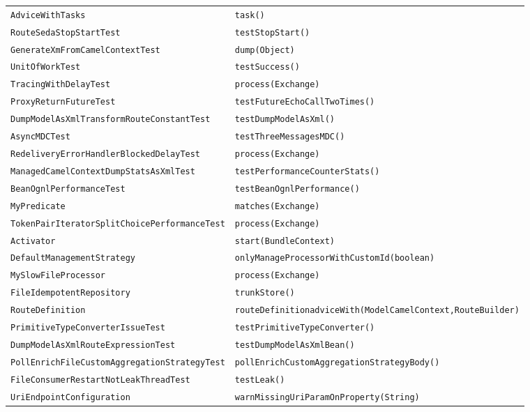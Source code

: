 \begin{center}
\begin{longtable}{ll}
\lstinline/AdviceWithTasks/&{\lstinline/task()/}\\
\lstinline/RouteSedaStopStartTest/&{\lstinline/testStopStart()/}\\
\lstinline/GenerateXmFromCamelContextTest/&{\lstinline/dump(Object)/}\\
\lstinline/UnitOfWorkTest/&{\lstinline/testSuccess()/}\\
\lstinline/TracingWithDelayTest/&{\lstinline/process(Exchange)/}\\
\lstinline/ProxyReturnFutureTest/&{\lstinline/testFutureEchoCallTwoTimes()/}\\
\lstinline/DumpModelAsXmlTransformRouteConstantTest/&{\lstinline/testDumpModelAsXml()/}\\
\lstinline/AsyncMDCTest/&{\lstinline/testThreeMessagesMDC()/}\\
\lstinline/RedeliveryErrorHandlerBlockedDelayTest/&{\lstinline/process(Exchange)/}\\
\lstinline/ManagedCamelContextDumpStatsAsXmlTest/&{\lstinline/testPerformanceCounterStats()/}\\
\lstinline/BeanOgnlPerformanceTest/&{\lstinline/testBeanOgnlPerformance()/}\\
\lstinline/MyPredicate/&{\lstinline/matches(Exchange)/}\\
\lstinline/TokenPairIteratorSplitChoicePerformanceTest/&{\lstinline/process(Exchange)/}\\
\lstinline/Activator/&{\lstinline/start(BundleContext)/}\\
\lstinline/DefaultManagementStrategy/&{\lstinline/onlyManageProcessorWithCustomId(boolean)/}\\
\lstinline/MySlowFileProcessor/&{\lstinline/process(Exchange)/}\\
\lstinline/FileIdempotentRepository/&{\lstinline/trunkStore()/}\\
\lstinline/RouteDefinition/&{\lstinline/routeDefinitionadviceWith(ModelCamelContext,RouteBuilder)/}\\
\lstinline/PrimitiveTypeConverterIssueTest/&{\lstinline/testPrimitiveTypeConverter()/}\\
\lstinline/DumpModelAsXmlRouteExpressionTest/&{\lstinline/testDumpModelAsXmlBean()/}\\
\lstinline/PollEnrichFileCustomAggregationStrategyTest/&{\lstinline/pollEnrichCustomAggregationStrategyBody()/}\\
\lstinline/FileConsumerRestartNotLeakThreadTest/&{\lstinline/testLeak()/}\\
\lstinline/UriEndpointConfiguration/&{\lstinline/warnMissingUriParamOnProperty(String)/}\\

\end{longtable}
\end{center}
